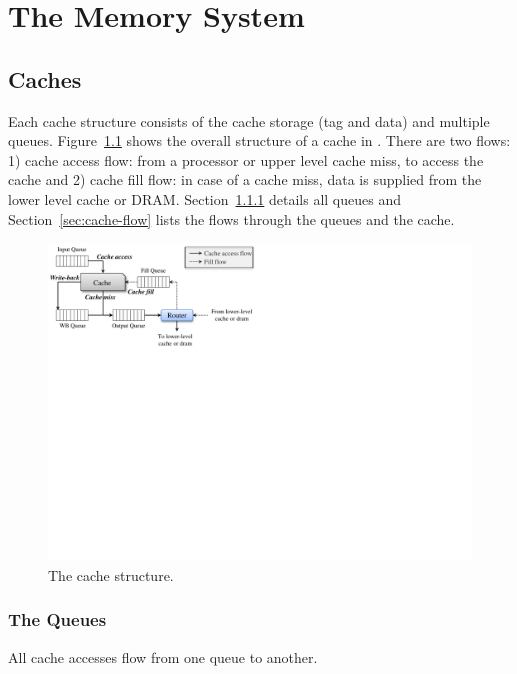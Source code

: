 

\chapter{The Memory System}
\label{sec:memory}


\section{Caches}

Each cache structure consists of the cache storage (tag and data) and multiple
queues. Figure~\ref{fig:cache} shows the overall structure of a cache in \SIM.
There are two flows: 1) cache access flow: from a processor or upper level
cache miss, to access the cache and 2) cache fill flow: in case of a cache
miss, data is supplied from the lower level cache or DRAM.
Section~\ref{sec:queue} details all queues and Section~\ref{sec:cache-flow}
lists the flows through the queues and the cache.

\begin{figure}[htb]
\centering
\includegraphics{figs/cache}
\caption{The cache structure.}
\label{fig:cache}
\end{figure}


\subsection{The Queues}
\label{sec:queue}

All cache accesses flow from one queue to another.

